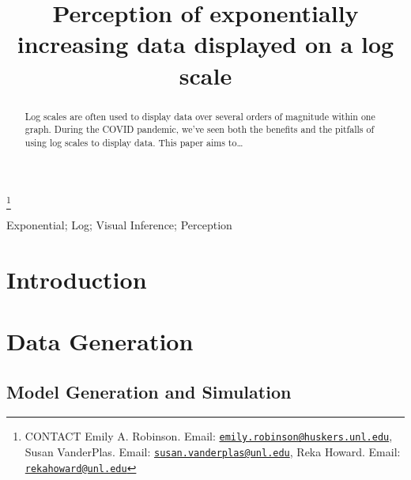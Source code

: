 \documentclass[]{interact}
\theoremstyle{plain}%
\theoremstyle{definition}
\theoremstyle{remark}
\begin{document}

\title{Perception of exponentially increasing data displayed on a log scale}


\author{
}

\thanks{CONTACT Emily A. Robinson. Email: \href{mailto:emily.robinson@huskers.unl.edu}{\nolinkurl{emily.robinson@huskers.unl.edu}}, Susan VanderPlas. Email: \href{mailto:susan.vanderplas@unl.edu}{\nolinkurl{susan.vanderplas@unl.edu}}, Reka Howard. Email: \href{mailto:rekahoward@unl.edu}{\nolinkurl{rekahoward@unl.edu}}}

\maketitle

\begin{abstract}
Log scales are often used to display data over several orders of
magnitude within one graph. During the COVID pandemic, we've seen both
the benefits and the pitfalls of using log scales to display data. This
paper aims to\ldots{}
\end{abstract}

\begin{keywords}
Exponential; Log; Visual Inference; Perception
\end{keywords}

\hypertarget{introduction}{%
\section{Introduction}\label{introduction}}

\citep{buja_statistical_2009, vanderplas_clusters_2017}

\hypertarget{data-generation}{%
\section{Data Generation}\label{data-generation}}

\hypertarget{model-generation-and-simulation}{%
\subsection{Model Generation and
Simulation}\label{model-generation-and-simulation}}
\end{document}
